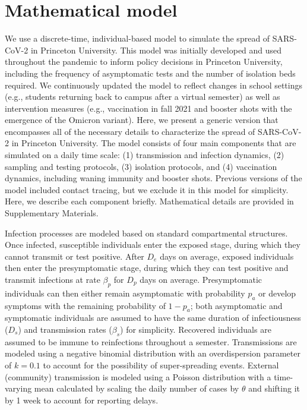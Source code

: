 \documentclass[12pt]{article}
\begin{document}
\section*{Mathematical model}

We use a discrete-time, individual-based model to simulate the spread of SARS-CoV-2 in Princeton University.
This model was initially developed and used throughout the pandemic to inform policy decisions in Princeton University, including the frequency of asymptomatic tests and the number of isolation beds required.
We continuously updated the model to reflect changes in school settings (e.g., students returning back to campus after a virtual semester) as well as intervention measures (e.g., vaccination in fall 2021 and booster shots with the emergence of the Omicron variant).
Here, we present a generic version that encompasses all of the necessary details to characterize the spread of SARS-CoV-2 in Princeton University.
The model consists of four main components that are simulated on a daily time scale: (1) transmission and infection dynamics, (2) sampling and testing protocols, (3) isolation protocols, and (4) vaccination dynamics, including waning immunity and booster shots.
Previous versions of the model included contact tracing, but we exclude it in this model for simplicity.
Here, we describe each component briefly. 
Mathematical details are provided in Supplementary Materials.

Infection processes are modeled based on standard compartmental structures.
Once infected, susceptible individuals enter the exposed stage, during which they cannot transmit or test positive. 
After $D_e$ days on average, exposed individuals then enter the presymptomatic stage, during which they can test positive and transmit infections at rate $\beta_p$ for $D_p$ days on average.
Presymptomatic individuals can then either remain asymptomatic with probability $p_a$ or develop symptoms with the remaining probability of $1-p_a$; both asymptomatic and symptomatic individuals are assumed to have the same duration of infectiousness ($D_s$) and transmission rates ($\beta_s$) for simplicity.
Recovered individuals are assumed to be immune to reinfections throughout a semester.
Transmissions are modeled using a negative binomial distribution with an overdispersion parameter of $k=0.1$ to account for the possibility of super-spreading events.
External (community) transmission is modeled using a Poisson distribution with a time-varying mean calculated by scaling the daily number of cases by $\theta$ and shifting it by 1 week to account for reporting delays.
\end{document}
